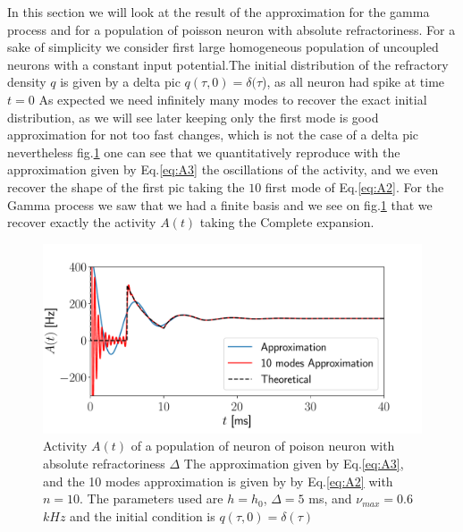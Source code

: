 \documentclass[12pt,twoside]{report}
\begin{document}
In this section we will look at the result of the approximation for the gamma process and for a population of poisson neuron with absolute refractoriness. For a sake of simplicity we consider first  large homogeneous population of uncoupled neurons with a constant input potential.The initial distribution of the refractory density $q$ is given by a delta pic $q(\tau,0)=\delta(\tau$), as all neuron had spike at time $t=0$
As expected we need infinitely many modes to recover the exact initial distribution, as we will see later keeping only the first mode is good approximation for not too fast changes, which is not the case of a delta pic nevertheless  fig.\ref{fig:delta_poisson} one can see that we quantitatively reproduce with the approximation given by Eq.\eqref{eq:A3} the oscillations of the activity, and we even recover the shape of the first pic taking the $10$ first mode of Eq.\eqref{eq:A2}.
For the Gamma process we saw that we had a finite basis and we see on fig.\ref{fig:delta_poisson} that we recover exactly the activity $A(t)$ taking the Complete expansion.



\begin{figure}[h!]
	\centering
	\includegraphics[width=0.8\linewidth]{delta_poisson.pdf}
	\caption{Activity $A(t)$ of a population of neuron of poison neuron with absolute refractoriness $\Delta$ The approximation given by Eq.\eqref{eq:A3}, and the 10 modes approximation is given by  by Eq.\ref{eq:A2} with $n=10$. The parameters used are $h=h_0$, $\Delta=5$ ms, and $\nu_{max}=0.6$ $kHz$  and the initial condition is $q(\tau,0)=\delta(\tau)$}
	\label{fig:delta_poisson}
\end{figure}
\end{document}
